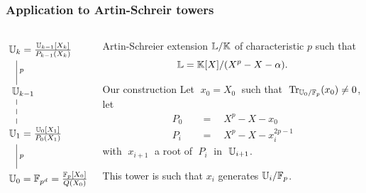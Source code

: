 \documentclass[10pt]{beamer}
\begin{document}
{
\begin{frame}
  \frametitle{Application to Artin-Schreir towers}
  
  \begin{columns}
    \begin{column}{0.3\textwidth}
      \Large\[\xymatrix{
        *+[r]{\U_k = \frac{\U_{k-1}[X_k]}{P_{k-1}(X_k)}}\ar@{-}[d]^p\\
        *+[r]{\U_{k-1}} \ar@{--}[d]\\
        *+[r]{\U_1 = \frac{\U_0[X_1]}{P_0(X_1)}} \ar@{-}[d]^p\\
        *+[r]{\U_0 = \F_{p^d} = \frac{\F_p[X_0]}{Q(X_0)}}
      }\]
    \end{column}
    \begin{column}{0.65\textwidth}
      \begin{block}{Artin-Schreier extension}
        $\mathbb{L}/\mathbb{K}$ of characteristic $p$ such that
        \[\mathbb{L}=\mathbb{K}[X]/(X^p-X-\alpha)\text{.}\]
      \end{block}
      
      \begin{block}{Our construction}
        Let $\;x_0 = X_0\;$ such that
        $\;\operatorname{Tr}_{\mathbb{U}_0/\mathbb{F}_p}(x_0) \ne 0$, let
        \begin{align*}
          P_0 \quad&=\quad X^p - X - x_0\\
          P_i \quad&=\quad X^p - X - x_i^{2p-1}
        \end{align*}
        with $\;x_{i+1}\;$ a root of $\;P_i\;$ in $\;\mathbb{U}_{i+1}$.

        This tower is such that $x_i$ generates $\mathbb{U}_i/\mathbb{F}_p$.
      \end{block}
    \end{column}
  \end{columns}
\end{frame}
}

\end{document}
